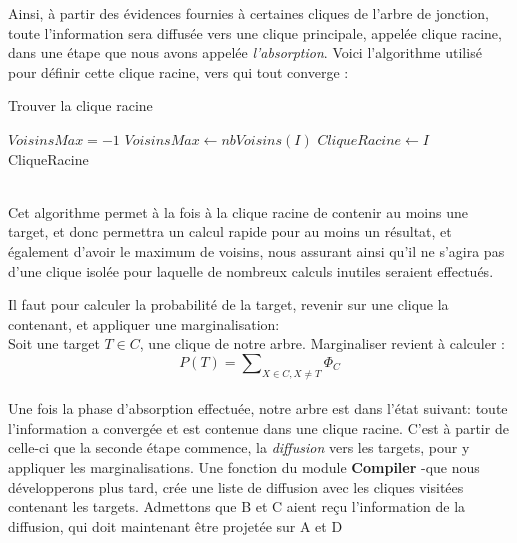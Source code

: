 \documentclass[a4paper]{article}
\begin{document}
Ainsi, à partir des évidences fournies à certaines cliques de l'arbre de jonction, toute l'information sera diffusée vers une clique principale, appelée clique racine, dans une étape que nous avons appelée 
\textit{l'absorption}. Voici l'algorithme utilisé pour définir cette clique racine, vers qui tout converge :
\begin{algorithm}
 \caption{Trouver la clique racine}
 \begin{algorithmic}
  \STATE $VoisinsMax = -1$
	  \STATE $VoisinsMax \leftarrow nbVoisins(I)$
	  \STATE $CliqueRacine \leftarrow I$
	\ENDIF
      \ENDIF
    \ENDFOR
  \ENDFOR
  \RETURN CliqueRacine
 \end{algorithmic}
\end{algorithm}
\\
Cet algorithme permet à la fois à la clique racine de contenir au moins une target, et donc permettra un calcul rapide pour au moins un résultat, et également d'avoir le maximum de voisins, nous assurant 
ainsi qu'il ne s'agira pas d'une clique isolée pour laquelle de nombreux calculs inutiles seraient effectués. 
\par \medbreak
Il faut pour calculer la probabilité de la target, revenir sur une clique la contenant, et appliquer une marginalisation:\\
Soit une target $T \in C$, une clique de notre arbre. Marginaliser revient à calculer :
$$P(T) = \sum\nolimits_{X \in C, X\neq T} \Phi_{C}$$ \\
Une fois la phase d'absorption effectuée, notre arbre est dans l'état suivant: toute l'information a convergée et est contenue dans une clique racine. C'est à partir de celle-ci que la seconde étape commence,
la \textit{diffusion} vers les targets, pour y appliquer les marginalisations. Une fonction du module \textbf{Compiler} -que nous développerons plus tard, crée une liste de diffusion avec les cliques
visitées contenant les targets. 
Admettons que B et C aient reçu l'information de la diffusion, qui doit maintenant être projetée sur A et D
\end{document}
